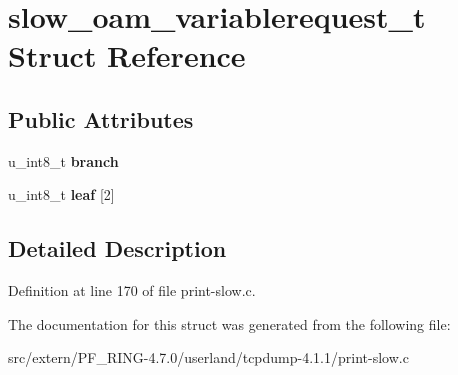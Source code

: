 \hypertarget{structslow__oam__variablerequest__t}{
\section{slow\_\-oam\_\-variablerequest\_\-t Struct Reference}
\label{structslow__oam__variablerequest__t}
}
\subsection*{Public Attributes}
\begin{DoxyCompactItemize}
\item 
\hypertarget{structslow__oam__variablerequest__t_aede3f028a65956d21d56c12fbba77e4f}{
u\_\-int8\_\-t {\bfseries branch}}
\label{structslow__oam__variablerequest__t_aede3f028a65956d21d56c12fbba77e4f}

\item 
\hypertarget{structslow__oam__variablerequest__t_af447e1934590257aa9ef22b465e69a11}{
u\_\-int8\_\-t {\bfseries leaf} \mbox{[}2\mbox{]}}
\label{structslow__oam__variablerequest__t_af447e1934590257aa9ef22b465e69a11}

\end{DoxyCompactItemize}


\subsection{Detailed Description}


Definition at line 170 of file print-\/slow.c.



The documentation for this struct was generated from the following file:\begin{DoxyCompactItemize}
\item 
src/extern/PF\_\-RING-\/4.7.0/userland/tcpdump-\/4.1.1/print-\/slow.c\end{DoxyCompactItemize}
